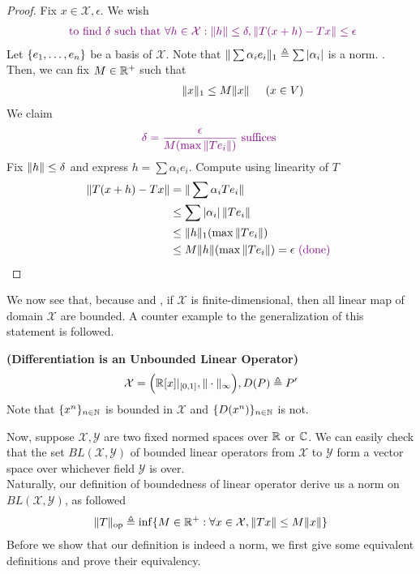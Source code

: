 \documentclass{report}
\begin{document}
\begin{proof}
Fix $x\in \mathcal{X},\epsilon $. We wish 
\begin{align*}
\textcolor{violet}{\text{ to find $\delta$ such that }\forall h\in \mathcal{X}: \| h \|\leq \delta, \| T(x+h)-Tx \|\leq \epsilon }
\end{align*}
Let $\{ e_1,\dots ,e_n \}$ be a basis of $\mathcal{X}$. Note that $ \|  \sum \alpha_i e_i  \|_1\triangleq  \sum \left|\alpha _i\right|$ is a norm. . Then, we can fix $M\in\mathbb{R}^+$ such that 
\begin{align*}
\hspace{2cm}\| x \|_1 \leq M\| x \|\hspace{0.5cm}(x \in V)
\end{align*}
We claim 
\begin{align*}
\textcolor{violet}{\delta= \frac{\epsilon }{M(\max \| Te_i \| )}\text{ suffices }} 
\end{align*}
Fix $\| h \|\leq \delta$ and express $h=\sum \alpha_i e_i$. Compute using linearity of $T$
\begin{align*}
  \| T(x+h)-Tx \|&=\| \sum \alpha_i T e_i \|\\
  &\leq \sum \left|\alpha _i\right| \| Te_i \|\\
  &\leq  \| h \|_1 (\max \| Te_i \| )\\
  &\leq M \| h \|(\max \| Te_i \|)=\epsilon \textcolor{violet}{\text{ (done) }}
\end{align*}
\end{proof}
\begin{mdframed}
We now see that, because  and , if $\mathcal{X}$ is finite-dimensional, then all linear map of domain $\mathcal{X}$ are bounded. A counter example to the generalization of this statement is followed. 
\begin{Example}{\textbf{(Differentiation is an Unbounded Linear Operator)}}{}
\begin{align*}
\mathcal{X}=\Big(\mathbb{R}[x]|_{[0,1]}, \| \cdot \|_\infty \Big), D(P)\triangleq P'
\end{align*}
Note that $\{ x^n \}_{n\in\mathbb{N}}$ is bounded in $\mathcal{X}$ and $\{ D(x^n) \}_{n\in\mathbb{N}}$ is not.   
\end{Example}
Now, suppose $\mathcal{X},\mathcal{Y}$ are two fixed normed spaces over $\mathbb{R}$ or $\mathbb{C}$. We can easily check that the set $BL(\mathcal{X},\mathcal{Y})$ of bounded linear operators from $\mathcal{X}$ to $\mathcal{Y}$ form a vector space over whichever field $\mathcal{Y}$ is over.\\

Naturally, our definition of boundedness of linear operator derive us a norm on $BL(\mathcal{X},\mathcal{Y})$, as followed 
\begin{align}
\label{tnop}
\| T \|_{\text{op}}\triangleq \inf \{ M\in\mathbb{R}^+ :\forall x \in \mathcal{X}, \| Tx \|\leq M\| x \| \}
\end{align}
Before we show that our definition is indeed a norm, we first give some equivalent definitions and prove their equivalency. 
\end{mdframed}
\end{document}
